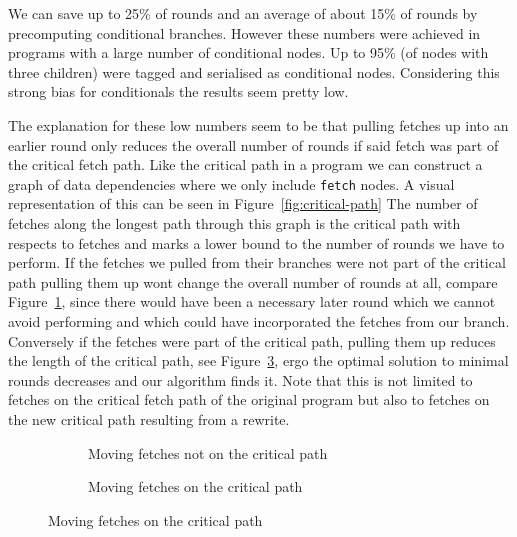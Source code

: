 We can save up to 25\% of rounds and an average of about 15\% of rounds by precomputing conditional branches.
However these numbers were achieved in programs with a large number of conditional nodes.
Up to 95\% (of nodes with three children) were tagged and serialised as conditional nodes.
Considering this strong bias for conditionals the results seem pretty low.

The explanation for these low numbers seem to be that pulling fetches up into an earlier round only reduces the overall number of rounds if said fetch was part of the critical fetch path.
Like the critical path in a program we can construct a graph of data dependencies where we only include \texttt{fetch} nodes.
A visual representation of this can be seen in Figure~\ref{fig:critical-path}
The number of fetches along the longest path through this graph is the critical path with respects to fetches and marks a lower bound to the number of rounds we have to perform.
If the fetches we pulled from their branches were not part of the critical path pulling them up wont change the overall number of rounds at all, compare Figure~\ref{fig:rewrite-not-crit-path}, since there would have been a necessary later round which we cannot avoid performing and which could have incorporated the fetches from our branch.
Conversely if the fetches were part of the critical path, pulling them up reduces the length of the critical path, see Figure~\ref{fig:rewrite-crit-path}, ergo the optimal solution to minimal rounds decreases and our algorithm finds it.
Note that this is not limited to fetches on the critical fetch path of the original program but also to fetches on the new critical path resulting from a rewrite.

\begin{figure}[h]

  \begin{subfigure}[b]{.5\textwidth}
    \caption{Moving fetches not on the critical path}
    \label{fig:rewrite-not-crit-path}
  \end{subfigure}

  \begin{subfigure}[b]{.5\textwidth}
    \caption{Moving fetches on the critical path}
    \label{fig:rewrite-crit-path}
  \end{subfigure}

\end{figure}

%


